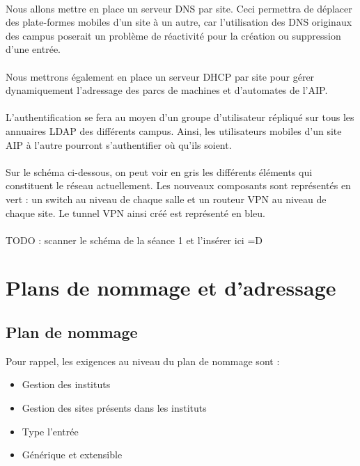 \documentclass[a4paper]{article}
\begin{document}
	\paragraph*{} %
	Nous allons mettre en place un serveur DNS par site. Ceci permettra de déplacer des plate-formes mobiles d'un site à un autre, car l'utilisation des DNS originaux des campus poserait un problème de réactivité pour la création ou suppression d'une entrée. 
	
	\paragraph*{} %
	Nous mettrons également en place un serveur DHCP par site pour gérer dynamiquement l'adressage des parcs de machines et d'automates de l'AIP. 
	
	\paragraph*{} %
	L'authentification se fera au moyen d'un groupe d'utilisateur répliqué sur tous les annuaires LDAP des différents campus. Ainsi, les utilisateurs mobiles d'un site AIP à l'autre pourront s'authentifier où qu'ils soient. 
	
	\paragraph*{} %
	Sur le schéma ci-dessous, on peut voir en gris les différents éléments qui constituent le réseau actuellement. Les nouveaux composants sont représentés en vert : un switch au niveau de chaque salle et un routeur VPN au niveau de chaque site. Le tunnel VPN ainsi créé est représenté en bleu. 
	
	\paragraph*{} %
	TODO : scanner le schéma de la séance 1 et l'insérer ici =D 

	
\section{Plans de nommage et d'adressage}
	\subsection{Plan de nommage}

	Pour rappel, les exigences au niveau du plan de nommage sont :\\
	\begin{itemize}
	\item Gestion des instituts
	\item Gestion des sites présents dans les instituts
	\item Type l'entrée
	\item Générique et extensible
	\end{itemize}	
\end{document}
